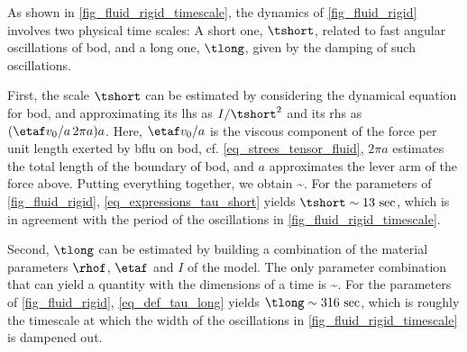 As shown in \cref{fig_fluid_rigid_timescale}, the dynamics of \cref{fig_fluid_rigid} involves two physical time scales: A short one, $\tshort$, related to fast angular oscillations of \ac{bod}, and a long one,  $\tlong$, given by the damping of such oscillations.

First, the scale $\tshort$ can be estimated by considering the dynamical equation  for \ac{bod}, and approximating its \ac{lhs} as $I / \tshort^2$ and its \ac{rhs} as $ (\etaf v_0 /a \, 2 \pi a) a$. Here,  $\etaf v_0 /a$ is the viscous component of the force per unit length exerted by \ac{bflu} on \ac{bod}, cf. \cref{eq_strees_tensor_fluid}, $2 \pi a$ estimates the total length of the boundary of \ac{bod}, and $a$ approximates the lever arm of the force above. Putting everything together, we obtain
\be
\label{eq_expressions_tau_short}
\tshort \sim {}.
\ee
For the parameters of \cref{fig_fluid_rigid}, \cref{eq_expressions_tau_short} yields $\tshort \sim 13 \, \sec$, which is in agreement with the  period of the oscillations in \cref{fig_fluid_rigid_timescale}.

Second, $\tlong$  can be estimated by building a combination of the material parameters $\rhof$, $\etaf$ and $I$ of the model. The only parameter combination that can yield a quantity with the dimensions of a time is
\be
\label{eq_def_tau_long}
\tlong \sim {}.
\ee
For the parameters of \cref{fig_fluid_rigid}, \cref{eq_def_tau_long} yields $\tlong \sim 316 \, \sec$, which is roughly the timescale at which the width of the oscillations in \cref{fig_fluid_rigid_timescale} is dampened out.